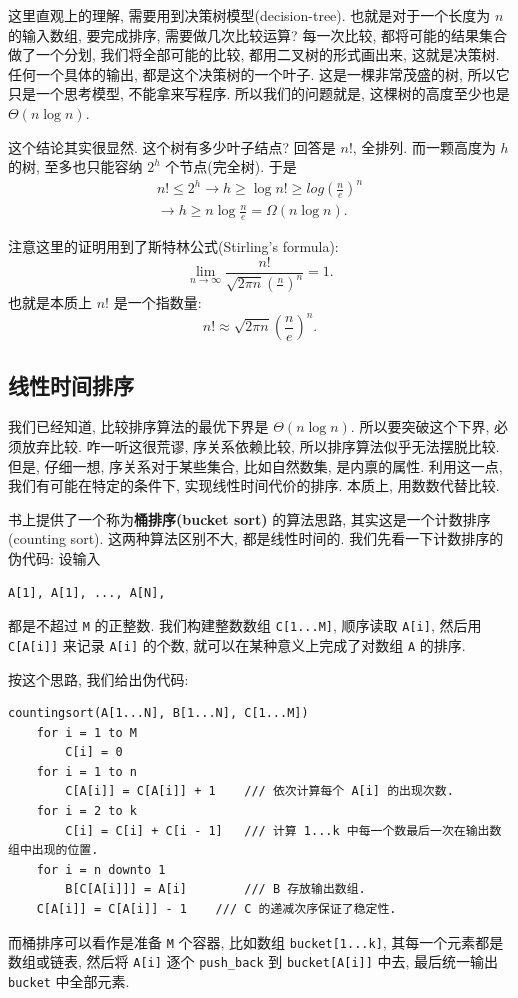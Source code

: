 \documentclass[a4paper]{ctexart}
\theoremstyle{definition}
\theoremstyle{definition}
\begin{document}
这里直观上的理解, 需要用到决策树模型(decision-tree).
也就是对于一个长度为 $n$ 的输入数组, 要完成排序, 需要做几次比较运算?
每一次比较, 都将可能的结果集合做了一个分划, 我们将全部可能的比较,
都用二叉树的形式画出来, 这就是决策树. 任何一个具体的输出, 都是这个决策树的一个叶子.
这是一棵非常茂盛的树, 所以它只是一个思考模型, 不能拿来写程序.
所以我们的问题就是, 这棵树的高度至少也是 $\Theta(n \log n)$.

这个结论其实很显然. 这个树有多少叶子结点? 回答是 $n!$, 全排列.
而一颗高度为 $h$ 的树, 至多也只能容纳 $2^h$ 个节点(完全树).
于是
$$
\begin{array}{r}
n! \leq 2^h \rightarrow h \geq \log n! \geq
log\left(\frac{n}{e}\right)^n \\ \rightarrow h \geq n \log \frac{n}{e}
= \Omega(n\log n).
\end{array}
$$

注意这里的证明用到了斯特林公式(Stirling's formula):
$$
\lim_{n \to \infty} \frac{n!}{\sqrt{2 \pi n}
  \left(\frac{n}{}\right)^n} = 1.
$$
也就是本质上 $n!$ 是一个指数量:
$$
n! \approx \sqrt{2 \pi n}\left(\frac{n}{e}\right)^n.
$$


\subsection{线性时间排序}

我们已经知道, 比较排序算法的最优下界是 $\Theta(n \log n)$.
所以要突破这个下界, 必须放弃比较. 咋一听这很荒谬, 序关系依赖比较,
所以排序算法似乎无法摆脱比较. 但是, 仔细一想, 序关系对于某些集合, 比如自然数集,
是内禀的属性. 利用这一点, 我们有可能在特定的条件下, 实现线性时间代价的排序.
本质上, 用数数代替比较. 

书上提供了一个称为{\bf 桶排序(bucket sort)} 的算法思路,
其实这是一个计数排序(counting sort). 这两种算法区别不大, 都是线性时间的.
我们先看一下计数排序的伪代码: 设输入
\begin{verbatim}
A[1], A[1], ..., A[N],
\end{verbatim}
都是不超过 \verb|M| 的正整数. 我们构建整数数组 \verb|C[1...M]|,
顺序读取 \verb|A[i]|, 然后用 \verb|C[A[i]]| 来记录 \verb|A[i]| 的个数,
就可以在某种意义上完成了对数组 \verb|A| 的排序.

按这个思路, 我们给出伪代码:

\begin{verbatim}
countingsort(A[1...N], B[1...N], C[1...M])
    for i = 1 to M
        C[i] = 0
    for i = 1 to n
        C[A[i]] = C[A[i]] + 1    /// 依次计算每个 A[i] 的出现次数.
    for i = 2 to k
        C[i] = C[i] + C[i - 1]   /// 计算 1...k 中每一个数最后一次在输出数组中出现的位置.
    for i = n downto 1
        B[C[A[i]]] = A[i]        /// B 存放输出数组.
	C[A[i]] = C[A[i]] - 1    /// C 的递减次序保证了稳定性.
\end{verbatim}
而桶排序可以看作是准备 \verb|M| 个容器, 比如数组 \verb|bucket[1...k]|,
其每一个元素都是数组或链表, 然后将 \verb|A[i]| 逐个 \verb|push_back|
到 \verb|bucket[A[i]]| 中去, 最后统一输出 \verb|bucket| 中全部元素. 
\end{document}

